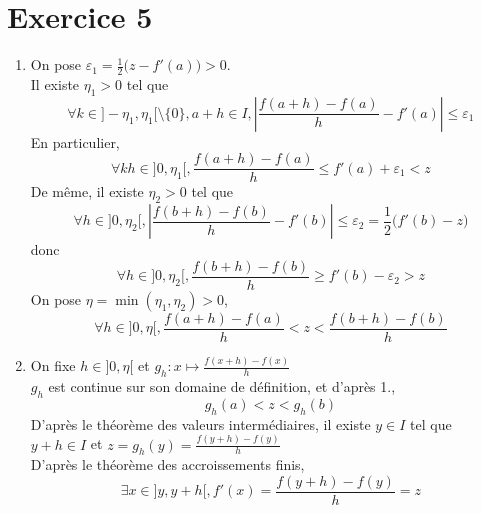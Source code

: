 \part{Exercice 5}

\begin{enumerate}
	\item On pose $\varepsilon_1 = \frac{1}{2}\big(z - f'(a) \big) > 0$.\\
		Il existe $\eta_1 > 0$ tel que \[
			\forall k \in ]-\eta_1, \eta_1[ \setminus \{0\}, a+h \in I,
			\left| \frac{f(a+h)- f(a)}{h} - f'(a)\right| \le \varepsilon_1
		\]
		En particulier, \[
			\forall k h \in ]0,\eta_1[, \frac{f(a+h) - f(a)}{h} \le f'(a) + \varepsilon_1 < z
		\] De même, il existe $\eta_2 >0$ tel que \[
			\forall h \in ]0,\eta_2[, \left| \frac{f(b+h) - f(b)}{h} - f'(b) \right| 
			\le \varepsilon_2 = \frac{1}{2}\big(f'(b) - z\big)
		\] donc \[
			\forall h \in ]0, \eta_2[, \frac{f(b + h) - f(b)}{h} \ge  f'(b) - \varepsilon_2 > z
		\] On pose $\eta = \min(\eta_1, \eta_2) >0$, \[
			\forall h \in ]0,\eta[, \frac{f(a+h)-f(a)}{h} < z < \frac{f(b + h) - f(b)}{h}
		\]
	\item On fixe $h \in ]0,\eta[$ et $g_h: x \mapsto \frac{f(x + h) - f(x)}{h}$ \\
		$g_h$ est continue sur son domaine de définition, et d'après 1., \[
			g_h(a) < z < g_h(b)
		\] D'après le théorème des valeurs intermédiaires, il existe $y \in I$ tel que $y + h \in I$ et $z = g_h(y) = \frac{f(y+h) - f(y)}{h}$ \\
		D'après le théorème des accroissements finis, \[
			\exists  x \in ]y, y+h[, f'(x) = \frac{f(y +h) - f(y)}{h} = z
		\]
\end{enumerate}

